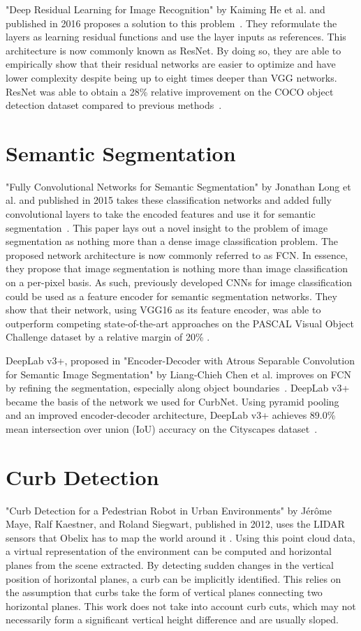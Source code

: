 "Deep Residual Learning for Image Recognition" by Kaiming He et al. and published in 2016 proposes a solution to this problem~\cite{resnet}.
They reformulate the layers as learning residual functions and use the layer inputs as references.
This architecture is now commonly known as ResNet.
By doing so, they are able to empirically show that their residual networks are easier to optimize and have lower complexity despite being up to eight times deeper than VGG networks.
ResNet was able to obtain a 28\% relative improvement on the COCO object detection dataset compared to previous methods~\cite{coco}.

\section{Semantic Segmentation}\label{section:relatedwork-segmentation}
"Fully Convolutional Networks for Semantic Segmentation" by Jonathan Long et al. and published in 2015 takes these classification networks and added fully convolutional layers to take the encoded features and use it for semantic segmentation~\cite{fcn}.
This paper lays out a novel insight to the problem of image segmentation as nothing more than a dense image classification problem.
The proposed network architecture is now commonly referred to as FCN.
In essence, they propose that image segmentation is nothing more than image classification on a per-pixel basis.
As such, previously developed CNNs for image classification could be used as a feature encoder for semantic segmentation networks.
They show that their network, using VGG16 as its feature encoder, was able to outperform competing state-of-the-art approaches on the PASCAL Visual Object Challenge dataset by a relative margin of 20\% \cite{pascal}.

DeepLab v3+, proposed in "Encoder-Decoder with Atrous Separable Convolution for Semantic Image Segmentation" by Liang-Chieh Chen et al. improves on FCN by refining the segmentation, especially along object boundaries~\cite{deeplab}.
DeepLab v3+ became the basis of the network we used for CurbNet.
Using pyramid pooling and an improved encoder-decoder architecture, DeepLab v3+ achieves 89.0\% mean intersection over union (IoU) accuracy on the Cityscapes dataset~\cite{cityscapes}.

\section{Curb Detection}\label{section:relatedwork-curbdetection}
"Curb Detection for a Pedestrian Robot in Urban Environments" by Jérôme Maye, Ralf Kaestner, and Roland Siegwart, published in 2012, uses the LIDAR sensors that Obelix has to map the world around it \cite{ethobelix}.
Using this point cloud data, a virtual representation of the environment can be computed and horizontal planes from the scene extracted.
By detecting sudden changes in the vertical position of horizontal planes, a curb can be implicitly identified.
This relies on the assumption that curbs take the form of vertical planes connecting two horizontal planes.
This work does not take into account curb cuts, which may not necessarily form a significant vertical height difference and are usually sloped.


